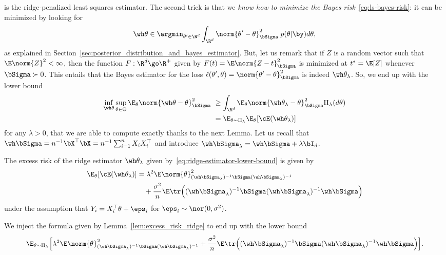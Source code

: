 is the ridge-penalized least squares estimator.
The second trick is that we \emph{know how to minimize the Bayes risk}~\eqref{eq:ls-bayes-risk}: it can be minimized by looking for
\begin{equation*}
	\wh \theta \in \argmin_{\theta' \in \R^d} \int_{\R^d} \norm{\theta' - \theta}_{\bSigma}^2 \; p(\theta | \by) d \theta,
\end{equation*}
as explained in Section~\ref{sec:posterior_distribution_and_bayes_estimator}.
But, let us remark that if $Z$ is a random vector such that $\E \norm{Z}^2 < \infty$, then the function $F : \R^d \go \R^+$ given 
by $F(t) = \E \norm{Z - t}_{\bSigma}^2$ is minimized at $t^* = \E[Z]$ whenever 
$\bSigma \succ 0$.
This entails that the Bayes estimator for the loss $\ell(\theta', \theta) = \norm{\theta' - \theta}_{\bSigma}^2$ is indeed $\wh \theta_\lambda$.
So, we end up with the lower bound 
\begin{align*}
	\inf_{\wh \theta} \sup_{\theta \in \Theta} \E_\theta 
	\norm{\wh \theta - \theta}_{\bSigma}^2 &\geq 
	\int_{\R^d} \E_\theta \norm{\wh \theta_\lambda - \theta}_{\bSigma}^2 \Pi_\lambda(d \theta) \\
	&= \E_{\theta \sim \Pi_\lambda} \E_\theta [\cE(\wh \theta_\lambda)]
\end{align*}
for any $\lambda > 0$, that we are able to compute exactly thanks to the next Lemma.
Let us recall that $\wh \bSigma = n^{-1} \bX^\top \bX = n^{-1} \sum_{i=1}^n X_i X_i^\top$ and introduce $\wh \bSigma_\lambda = \wh \bSigma + \lambda \bI_d$.
\begin{lemma}
	\label{lem:excess_risk_ridge}
	The excess risk of the ridge estimator $\wh \theta_\lambda$ given by~\eqref{eq:ridge-estimator-lower-bound} is given by
	\begin{align*}
		\E_\theta [\cE(\wh \theta_\lambda)] &= \lambda^2 \E \norm{\theta}_{(\wh \bSigma_\lambda)^{-1} \bSigma (\wh \bSigma_\lambda)^{-1}}^2 \\
		& \quad + \frac{\sigma^2}{n} \E \tr \Big( (\wh \bSigma_\lambda)^{-1} \bSigma (\wh \bSigma_\lambda)^{-1} \wh \bSigma \Big)
	\end{align*}
	under the assumption that $Y_i = X_i^\top \theta + \eps_i$ for $\eps_i \sim \nor(0, \sigma^2)$.
\end{lemma}
We inject the formula given by Lemma~\ref{lem:excess_risk_ridge} to end up with the lower bound
\begin{equation*}
	\E_{\theta \sim \Pi_\lambda} \Big[ \lambda^2 \E \norm{\theta}_{(\wh \bSigma_\lambda)^{-1} \bSigma (\wh \bSigma_\lambda)^{-1}}^2  + \frac{\sigma^2}{n} \E \tr \Big( (\wh \bSigma_\lambda)^{-1} \bSigma (\wh \bSigma_\lambda)^{-1} \wh \bSigma \Big) \Big].
\end{equation*}
